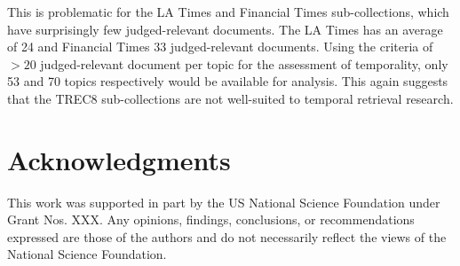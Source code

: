 \documentclass[runningheads,a4paper]{llncs}
\begin{document}
This is problematic for the LA Times and Financial Times sub-collections, which have surprisingly few judged-relevant documents. The LA Times has an average of 24 and Financial Times 33 judged-relevant documents.  Using the criteria of $>20$ judged-relevant document per topic for the assessment of temporality, only 53 and 70 topics respectively would be available for analysis. This again suggests that the TREC8 sub-collections are not well-suited to temporal retrieval research.
	
\section{Acknowledgments}
This work was supported in part by the US National Science Foundation under Grant Nos. XXX. Any opinions, findings, conclusions, or recommendations expressed are those of the authors and do not necessarily reflect the views of the National Science Foundation. 


  
\end{document}
